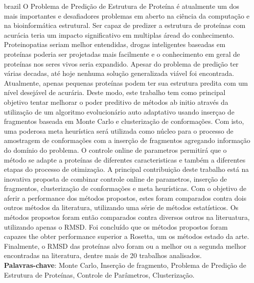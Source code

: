 
\begin{resumo}[Resumo]
  \begin{otherlanguage*}{brazil}
    O Problema de Predição de Estrutura de Proteína é atualmente um dos mais
    importantes e desafiadores problemas em aberto na ciência da computação e
    na bioinformática estrutural. Ser capaz de predizer a estrutura de proteínas
    com acurácia teria um impacto significativo em multiplas áread do
    conhecimento. Proteinopatias seriam melhor entendidas, drogas inteligentes
    baseadas em proteínas poderia ser projetadas mais facilmente e o
    conhecimento em geral de proteínas nos seres vivos seria expandido.
    Apesar do problema de predição ter várias decadas, até hoje nenhuma solução
    generalizada viável foi encontrada. Atualmente, apenas pequenas proteínas
    podem ter sua estrutura predita com um nível desejável de acurária. Deste
    modo, este trabalho tem como principal objetivo tentar melhorar o poder
    preditivo de métodos ab initio através da utilização de um algoritmo
    evolucionário auto adaptativo usando inserçao de fragmentos baseada em
    Monte Carlo e clusterização de conformações. Com isto, uma poderosa meta
    heurística será utilizada como núcleo para o processo de amostragem de
    conformações com a inserção de fragmentos agregando informação do domínio do
    problema. O controle online de parametros permitirá que o método se adapte a
    proteínas de diferentes caracteristicas e também a diferentes etapas do
    processo de otimização. A principal contribuição deste trabalho está na
    inovativa proposta de combinar controle online de parametros, inserção de
    fragmentos, clusterização de conformações e meta heurísticas. Com o objetivo
    de aferir a performance dos métodos propostos, estes foram comparados contra
    dois outros métodos da literatura, utilizando uma série de métodos
    estatísticos. Os métodos propostos foram então comparados contra diversos
    outros na literuatura, utilizando apenas o RMSD. Foi concluído que os
    métodos propostos foram capazes the obter performance superior a Rosetta, um
    os métodos estado da arte. Finalmente, o RMSD das proteínas alvo foram ou
    a melhor ou a segunda melhor encontradas na literatura, dentre mais de 20
    trabalhos analisados.
    \\
    \vspace{\onelineskip}
    \noindent
    \textbf{Palavras-chave}: Monte Carlo, Inserção de fragmento, Problema de Predição de Estrutura de Proteínas, Controle de Parâmetros, Clusterização.
  \end{otherlanguage*}
\end{resumo}

\listoffigures*
\cleardoublepage

\listoftables*
\cleardoublepage
